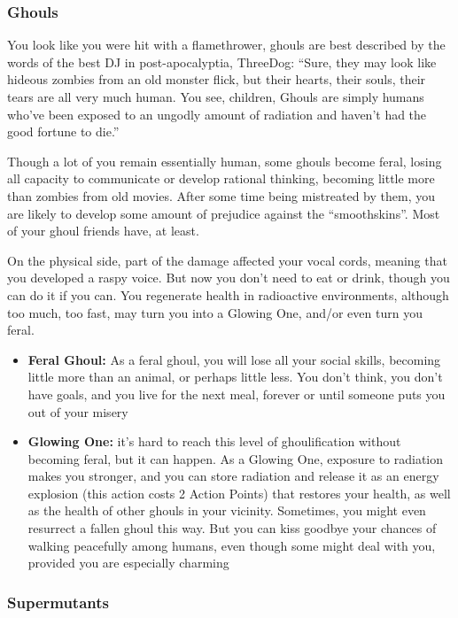 \documentclass[11pt]{article} %
\begin{document}
\subsubsection{Ghouls}

You look like you were hit with a flamethrower, ghouls are best described by the words of the best DJ in post-apocalyptia, ThreeDog: ``Sure, they may look like hideous zombies from an old monster flick, but their hearts, their souls, their tears are all very much human. You see, children, Ghouls are simply humans who've been exposed to an ungodly amount of radiation and haven't had the good fortune to die.'' 

Though a lot of you remain essentially human, some ghouls become feral, losing all capacity to communicate or develop rational thinking, becoming little more than zombies from old movies. After some time being mistreated by them, you are likely to develop some amount of prejudice against the ``smoothskins''. Most of your ghoul friends have, at least.

On the physical side, part of the damage affected your vocal cords, meaning that you developed a raspy voice. But now you don't need to eat or drink, though you can do it if you can. You regenerate health in radioactive environments, although too much, too fast, may turn you into a Glowing One, and/or even turn you feral. 

\begin{itemize}
	\item \textbf{Feral Ghoul:} As a feral ghoul, you will lose all your social skills, becoming little more than an animal, or perhaps little less. You don't think, you don't have goals, and you live for the next meal, forever or until someone puts you out of your misery
	\item \textbf{Glowing One:} it's hard to reach this level of ghoulification without becoming feral, but it can happen. As a Glowing One, exposure to radiation makes you stronger, and you can store radiation and release it as an energy explosion (this action costs 2 Action Points) that restores your health, as well as the health of other ghouls in your vicinity. Sometimes, you might even resurrect a fallen ghoul this way. But you can kiss goodbye your chances of walking peacefully among humans, even though some might deal with you, provided you are especially charming
\end{itemize}

\subsubsection{Supermutants} 
\end{document}
